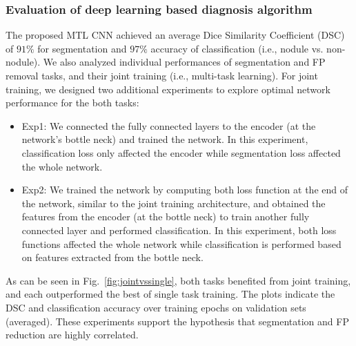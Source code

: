 \documentclass[preprint,12pt]{elsarticle}
\begin{document}
\subsubsection{Evaluation of deep learning based diagnosis algorithm}
The proposed MTL CNN achieved an average Dice Similarity Coefficient (DSC) of $91\%$ for segmentation and $97\%$ accuracy of classification (i.e., nodule vs. non-nodule). We also analyzed individual performances of segmentation and FP removal tasks, and their joint training (i.e., multi-task learning). For joint training, we designed two additional experiments to explore optimal network performance for the both tasks:
\begin{itemize}
\item Exp1: We connected the fully connected layers to the encoder (at the network's bottle neck) and trained the network. In this experiment, classification loss only affected the encoder while segmentation loss affected the whole network.
\item Exp2: We trained the network by computing both loss function at the end of the network, similar to the joint training architecture, and obtained the features from the encoder (at the bottle neck) to train another fully connected layer and performed classification. In this experiment, both loss functions affected the whole network while classification is performed based on features extracted from the bottle neck.
\end{itemize}
As can be seen in Fig.~\ref{fig:jointvssingle}, both tasks benefited from joint training, and each outperformed the best of single task training. The plots indicate the DSC and classification accuracy over training epochs on validation sets (averaged). These experiments support the hypothesis that segmentation and FP reduction are highly correlated.
\end{document}

